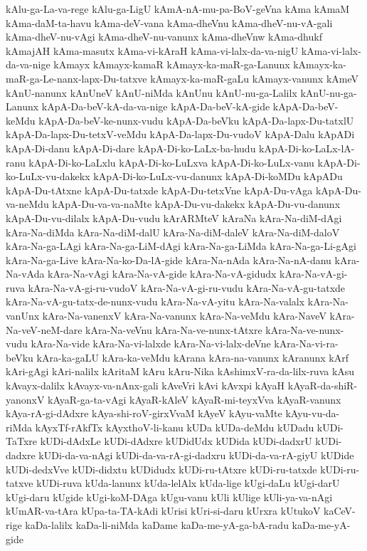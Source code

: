 {kAlu-ga-La-va-rege
kAlu-ga-LigU
kAmA-nA-mu-pa-BoV-geVna
kAma
kAmaM
kAma-daM-ta-havu
kAma-deV-vana
kAma-dheVnu
kAma-dheV-nu-vA-gali
kAma-dheV-nu-vAgi
kAma-dheV-nu-vanunx
kAma-dheVnw
kAma-dhukf
kAmajAH
kAma-masutx
kAma-vi-kAraH
kAma-vi-lalx-da-va-nigU
kAma-vi-lalx-da-va-nige
kAmayx
kAmayx-kamaR
kAmayx-ka-maR-ga-Lanunx
kAmayx-ka-maR-ga-Le-nanx-lapx-Du-tatxve
kAmayx-ka-maR-gaLu
kAmayx-vanunx
kAmeV
kAnU-nanunx
kAnUneV
kAnU-niMda
kAnUnu
kAnU-nu-ga-Lalilx
kAnU-nu-ga-Lanunx
kApA-Da-beV-kA-da-va-nige
kApA-Da-beV-kA-gide
kApA-Da-beV-keMdu
kApA-Da-beV-ke-nunx-vudu
kApA-Da-beVku
kApA-Da-lapx-Du-tatxlU
kApA-Da-lapx-Du-tetxV-veMdu
kApA-Da-lapx-Du-vudoV
kApA-Dalu
kApADi
kApA-Di-danu
kApA-Di-dare
kApA-Di-ko-LaLx-ba-hudu
kApA-Di-ko-LaLx-lA-ranu
kApA-Di-ko-LaLxlu
kApA-Di-ko-LuLxva
kApA-Di-ko-LuLx-vanu
kApA-Di-ko-LuLx-vu-dakekx
kApA-Di-ko-LuLx-vu-danunx
kApA-Di-koMDu
kApADu
kApA-Du-tAtxne
kApA-Du-tatxde
kApA-Du-tetxVne
kApA-Du-vAga
kApA-Du-va-neMdu
kApA-Du-va-va-naMte
kApA-Du-vu-dakekx
kApA-Du-vu-danunx
kApA-Du-vu-dilalx
kApA-Du-vudu
kArARMteV
kAraNa
kAra-Na-diM-dAgi
kAra-Na-diMda
kAra-Na-diM-dalU
kAra-Na-diM-daleV
kAra-Na-diM-daloV
kAra-Na-ga-LAgi
kAra-Na-ga-LiM-dAgi
kAra-Na-ga-LiMda
kAra-Na-ga-Li-gAgi
kAra-Na-ga-Live
kAra-Na-ko-Da-lA-gide
kAra-Na-nAda
kAra-Na-nA-danu
kAra-Na-vAda
kAra-Na-vAgi
kAra-Na-vA-gide
kAra-Na-vA-gidudx
kAra-Na-vA-gi-ruva
kAra-Na-vA-gi-ru-vudoV
kAra-Na-vA-gi-ru-vudu
kAra-Na-vA-gu-tatxde
kAra-Na-vA-gu-tatx-de-nunx-vudu
kAra-Na-vA-yitu
kAra-Na-valalx
kAra-Na-vanUnx
kAra-Na-vanenxV
kAra-Na-vanunx
kAra-Na-veMdu
kAra-NaveV
kAra-Na-veV-neM-dare
kAra-Na-veVnu
kAra-Na-ve-nunx-tAtxre
kAra-Na-ve-nunx-vudu
kAra-Na-vide
kAra-Na-vi-lalxde
kAra-Na-vi-lalx-deVne
kAra-Na-vi-ra-beVku
kAra-ka-gaLU
kAra-ka-veMdu
kArana
kAra-na-vanunx
kAranunx
kArf
kAri-gAgi
kAri-nalilx
kAritaM
kAru
kAru-Nika
kAshimxV-ra-da-lilx-ruva
kAsu
kAvayx-dalilx
kAvayx-va-nAnx-gali
kAveVri
kAvi
kAvxpi
kAyaH
kAyaR-da-shiR-yanonxV
kAyaR-ga-ta-vAgi
kAyaR-kAleV
kAyaR-mi-teyxVva
kAyaR-vanunx
kAya-rA-gi-dAdxre
kAya-shi-roV-girxVvaM
kAyeV
kAyu-vaMte
kAyu-vu-da-riMda
kAyxTf-rAkfTx
kAyxthoV-li-kanu
kUDa
kUDa-deMdu
kUDadu
kUDi-TaTxre
kUDi-dAdxLe
kUDi-dAdxre
kUDidUdx
kUDida
kUDi-dadxrU
kUDi-dadxre
kUDi-da-va-nAgi
kUDi-da-va-rA-gi-dadxru
kUDi-da-va-rA-giyU
kUDide
kUDi-dedxVve
kUDi-didxtu
kUDidudx
kUDi-ru-tAtxre
kUDi-ru-tatxde
kUDi-ru-tatxve
kUDi-ruva
kUda-lanunx
kUda-lelAlx
kUda-lige
kUgi-daLu
kUgi-darU
kUgi-daru
kUgide
kUgi-koM-DAga
kUgu-vanu
kUli
kUlige
kUli-ya-va-nAgi
kUmAR-va-tAra
kUpa-ta-TA-kAdi
kUrisi
kUri-si-daru
kUrxra
kUtukoV
kaCeV-rige
kaDa-lalilx
kaDa-li-niMda
kaDame
kaDa-me-yA-ga-bA-radu
kaDa-me-yA-gide
}
